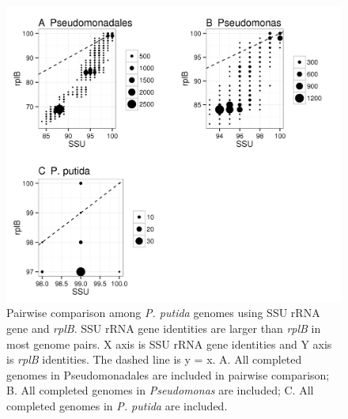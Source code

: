 \documentclass[]{msu-thesis}
\begin{document}
\begin{figure}[tbph!]
  \centering
  \includegraphics[scale=1]{figs/P_putida}
  \caption[Pairwise comparison among \textit{P. putida} genomes using SSU rRNA gene and \textit{rplB}]{Pairwise comparison among \textit{P. putida} genomes using SSU rRNA gene and \textit{rplB}. SSU rRNA gene identities are larger than \textit{rplB} in most genome pairs. X axis is SSU rRNA gene identities and Y axis is \textit{rplB} identities. The dashed line is y = x. A. All completed genomes in Pseudomonadales are included in pairwise comparison; B. All completed genomes in \textit{Pseudomonas} are included; C. All completed genomes in \textit{P. putida} are included.}
  \label{fig:PPutida}
\end{figure}
\end{document}
